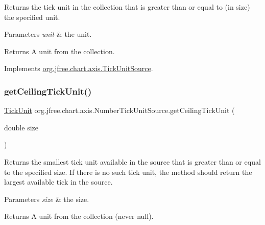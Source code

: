 Returns the tick unit in the collection that is greater than or equal to (in size) the specified unit.


\begin{DoxyParams}{Parameters}
{\em unit} & the unit.\\
\hline
\end{DoxyParams}
\begin{DoxyReturn}{Returns}
A unit from the collection. 
\end{DoxyReturn}


Implements \mbox{\hyperlink{interfaceorg_1_1jfree_1_1chart_1_1axis_1_1_tick_unit_source_a38db8c401c916244f48a758a8e8d469f}{org.\+jfree.\+chart.\+axis.\+Tick\+Unit\+Source}}.

\mbox{\label{classorg_1_1jfree_1_1chart_1_1axis_1_1_number_tick_unit_source_a552cf17dfcced017ee6497a433a9467a}} 
\subsubsection{\texorpdfstring{get\+Ceiling\+Tick\+Unit()}{getCeilingTickUnit()}\hspace{0.1cm}{\footnotesize\ttfamily [2/2]}}
{\footnotesize\ttfamily \mbox{\hyperlink{classorg_1_1jfree_1_1chart_1_1axis_1_1_tick_unit}{Tick\+Unit}} org.\+jfree.\+chart.\+axis.\+Number\+Tick\+Unit\+Source.\+get\+Ceiling\+Tick\+Unit (\begin{DoxyParamCaption}\item[{double}]{size }\end{DoxyParamCaption})}

Returns the smallest tick unit available in the source that is greater than or equal to the specified size. If there is no such tick unit, the method should return the largest available tick in the source.


\begin{DoxyParams}{Parameters}
{\em size} & the size.\\
\hline
\end{DoxyParams}
\begin{DoxyReturn}{Returns}
A unit from the collection (never {\ttfamily null}). 
\end{DoxyReturn}


